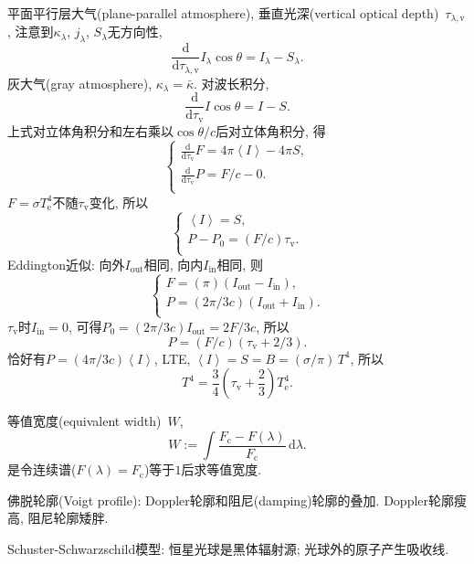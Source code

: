 平面平行层大气(plane-parallel atmosphere), 垂直光深(vertical optical depth)~$\tau_{\lambda,\text{v}}$, 注意到$\kappa_\lambda$, $j_\lambda$, $S_\lambda$无方向性,
\begin{equation*}
    \frac{\mathrm{d}}{\mathrm{d}\tau_{\lambda,\text{v}}}I_\lambda\cos\theta=I_\lambda-S_\lambda.
\end{equation*}
灰大气(gray atmosphere), $\kappa_\lambda=\bar{\kappa}$. 对波长积分,
\begin{equation*}
    \frac{\mathrm{d}}{\mathrm{d}\tau_{\text{v}}}I\cos\theta=I-S.
\end{equation*}
上式对立体角积分和左右乘以$\cos\theta/c$后对立体角积分, 得
\begin{equation*}
    \begin{cases}
        \frac{\mathrm{d}}{\mathrm{d}\tau_{\text{v}}}F=4\pi \left\langle I\right\rangle -4\pi S , \\
        \frac{\mathrm{d}}{\mathrm{d}\tau_{\text{v}}}P=F/c-0 . \\
    \end{cases}
\end{equation*}
$F=\sigma T_\text{e}^4$不随$\tau_{\text{v}}$变化, 所以
\begin{equation*}
    \begin{cases}
        \left\langle I\right\rangle = S , \\
        P-P_0=(F/c)\tau_{\text{v}} . \\
    \end{cases}
\end{equation*}
Eddington近似: 向外$I_\text{out}$相同, 向内$I_\text{in}$相同, 则
\begin{equation*}
    \begin{cases}
        F=(\pi)(I_\text{out}-I_\text{in}) , \\
        P=(2\pi/3c)(I_\text{out}+I_\text{in}) . \\
    \end{cases}
\end{equation*}
$\tau_{\text{v}}$时$I_\text{in}=0$, 可得$P_0=(2\pi/3c)I_\text{out}=2F/3c$, 所以
\begin{equation*}
    P=(F/c)(\tau_{\text{v}}+2/3).
\end{equation*}
恰好有$P=(4\pi/3c)\left\langle I\right\rangle $, LTE, $\left\langle I\right\rangle=S=B=(\sigma/\pi)\,T^4$, 所以
\begin{equation*}
    T^4 = \frac{3}{4}(\tau_{\text{v}}+\frac{2}{3})T_\text{e}^4.
\end{equation*}

等值宽度(equivalent width)~$W$,
\begin{equation*}
    W:=\int\frac{F_\text{c}-F(\lambda)}{F_\text{c}}\,\mathrm{d}\lambda.
\end{equation*}
是令连续谱($F(\lambda)=F_\text{c}$)等于$1$后求等值宽度.

佛脱轮廓(Voigt profile): Doppler轮廓和阻尼(damping)轮廓的叠加. Doppler轮廓瘦高, 阻尼轮廓矮胖.

Schuster-Schwarzschild模型: 恒星光球是黑体辐射源; 光球外的原子产生吸收线.
